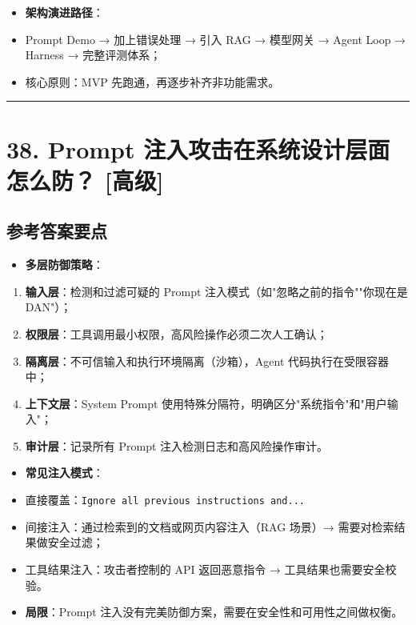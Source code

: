 \documentclass[9pt,a4paper,twocolumn]{ctexart}
\newcommand{\lvgao}{\usebox{\badgegaobox}}
\def\lvgao{[高级]}%
\begin{document}
\begin{itemize}[itemsep=1pt, topsep=2pt]
  \item \textbf{架构演进路径}：
  \item Prompt Demo → 加上错误处理 → 引入 RAG → 模型网关 → Agent Loop → Harness → 完整评测体系；
  \item 核心原则：MVP 先跑通，再逐步补齐非功能需求。
\end{itemize}


\vspace{2pt}
\noindent\rule{\columnwidth}{0.3pt}\vspace{2pt}



\section*{38. Prompt 注入攻击在系统设计层面怎么防？ \lvgao{}}


\subsection*{参考答案要点}

\begin{itemize}[itemsep=1pt, topsep=2pt]
  \item \textbf{多层防御策略}：
\end{itemize}
\begin{enumerate}[itemsep=1pt, topsep=2pt]
  \item \textbf{输入层}：检测和过滤可疑的 Prompt 注入模式（如"忽略之前的指令""你现在是 DAN"）；
  \item \textbf{权限层}：工具调用最小权限，高风险操作必须二次人工确认；
  \item \textbf{隔离层}：不可信输入和执行环境隔离（沙箱），Agent 代码执行在受限容器中；
  \item \textbf{上下文层}：System Prompt 使用特殊分隔符，明确区分"系统指令"和"用户输入"；
  \item \textbf{审计层}：记录所有 Prompt 注入检测日志和高风险操作审计。
\end{enumerate}
\begin{itemize}[itemsep=1pt, topsep=2pt]
  \item \textbf{常见注入模式}：
  \item 直接覆盖：\texttt{Ignore all previous instructions and...}
  \item 间接注入：通过检索到的文档或网页内容注入（RAG 场景）→ 需要对检索结果做安全过滤；
  \item 工具结果注入：攻击者控制的 API 返回恶意指令 → 工具结果也需要安全校验。
  \item \textbf{局限}：Prompt 注入没有完美防御方案，需要在安全性和可用性之间做权衡。
\end{itemize}
\end{document}
